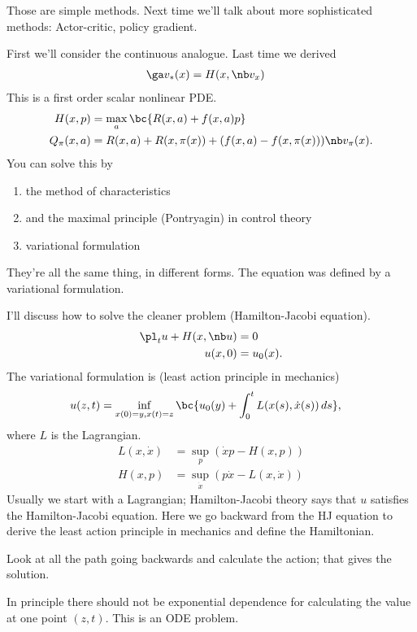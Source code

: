 Those are simple methods. Next time we'll talk about more sophisticated methods: Actor-critic, policy gradient.

First we'll consider the continuous analogue.
Last time we derived
\begin{align}
\ga v_*(x) &= H(x,\nb v_x)
\end{align}
This is a first order scalar nonlinear PDE.
\begin{align}
\label{e:h-max}
H(x,p) &= \max_a\bc{R(x,a) + f(x,a) p}\\
Q_\pi(x,a) &= R(x,a) + R(x,\pi(x)) + (f(x,a) - f(x,\pi(x))) \nb v_\pi(x).
\end{align}
You can solve this by 
\begin{enumerate}
\item
the method of characteristics
\item
and the maximal principle (Pontryagin) in control theory
\item
variational formulation
\end{enumerate}
They're all the same thing, in different forms. The equation was defined by a variational formulation.

I'll discuss how to solve the cleaner problem (Hamilton-Jacobi equation).
\begin{align}
\pl_t u+ H(x,\nb u)&=0\\
u(x,0) &=u_0(x).
\end{align}
The variational formulation is  (least action principle in mechanics)
\begin{align}\label{e:uzt}
u(z,t) &= \inf_{x(0)=y, x(t)=z} \bc{u_0(y) + \int_0^t L(x(s), \dot x(s))\,ds},
\end{align}
where $L$ is the Lagrangian. 
\begin{align}
L(x,\dot x) &= \sup_p(\dot x p - H(x,p))\\
H(x,p) &= \sup_{\dot x}(p\dot x- L(x,\dot x))
\end{align}
Usually we start with a Lagrangian; Hamilton-Jacobi theory says that $u$ satisfies the Hamilton-Jacobi equation. Here we go backward from the HJ equation to derive the least action principle in mechanics and define the Hamiltonian.

Look at all the path going backwards and calculate the action; that gives the solution.

In principle there should not be exponential dependence for calculating the value at one point $(z,t)$. This is an ODE problem. 

